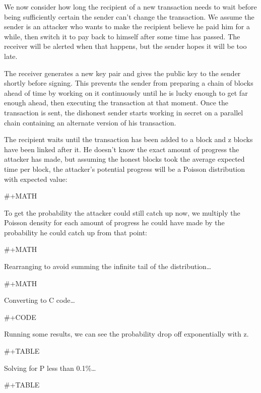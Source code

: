 \documentclass[11pt]{article}
\begin{document}
We now consider how long the recipient of a new transaction needs to wait before being sufficiently certain the sender can't change the transaction.
We assume the sender is an attacker who wants to make the recipient believe he paid him for a while, then switch it to pay back to himself after some time has passed.
The receiver will be alerted when that happens, but the sender hopes it will be too late.

The receiver generates a new key pair and gives the public key to the sender shortly before signing.
This prevents the sender from preparing a chain of blocks ahead of time by working on it continuously until he is lucky enough to get far enough ahead, then executing the transaction at that moment.
Once the transaction is sent, the dishonest sender starts working in secret on a parallel chain containing an alternate version of his transaction.

The recipient waits until the transaction has been added to a block and z blocks have been linked after it.
He doesn't know the exact amount of progress the attacker has made, but assuming the honest blocks took the average expected time per block, the attacker's potential progress will be a Poisson distribution with expected value:

\#+MATH

To get the probability the attacker could still catch up now, we multiply the
Poisson density for
each amount of progress he could have made by the probability he could catch
up from that point:

\#+MATH

Rearranging to avoid summing the infinite tail of the distribution\ldots{}

\#+MATH

Converting to C code\ldots{}

\#+CODE

Running some results, we can see the probability drop off exponentially with z.

\#+TABLE

Solving for P less than 0.1\%\ldots{}

\#+TABLE
\end{document}
